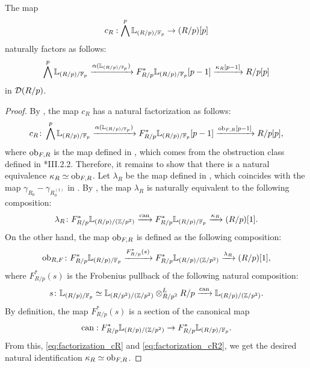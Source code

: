 \documentclass[11pt,a4paper]{amsart}
\begin{document}
\begin{proposition}\label{lemma2.8}
    The map 
    \[c_R:\bigwedge^p\mathbb{L}_{(R/p)/\mathbb{F}_p}\to (R/p)[p]\]
    naturally factors as follows:
    \[\bigwedge^p\mathbb{L}_{(R/p)/\mathbb{F}_p}\xrightarrow[]{\alpha(\mathbb{L}_{(R/p)/\mathbb{F}_p})}F^*_{R/p}\mathbb{L}_{(R/p)/\mathbb{F}_p}[p-1]\xrightarrow[]{\kappa_R[p-1]}R/p[p]\] in $\mathcal{D}(R/p)$. 
\end{proposition}
\begin{proof}
    By \cite[Theorem 7.1]{petrov2025Nondecomposability}, the map $c_R$ has a natural factorization as follows:
    \[c_R \colon \bigwedge^p\mathbb{L}_{(R/p)/\mathbb{F}_p}\xrightarrow[]{\alpha(\mathbb{L}_{(R/p)/\mathbb{F}_p})}F^*_{R/p}\mathbb{L}_{(R/p)/\mathbb{F}_p}[p-1]\xrightarrow[]{\operatorname{ob}_{F,R}[p-1]}R/p[p],\] where $\operatorname{ob}_{F,R}$ is the map defined in \cite[Convention 5.5 and Lemma 5.6]{petrov2025Nondecomposability}, which comes from the obstruction class defined in \cite{illusie1971Complexe}*{III.2.2}.
    Therefore, it remains to show that there is a natural equivalence \(\kappa_R\simeq \operatorname{ob}_{F,R}\).
    Let $\lambda_R$ be the map defined in \cite[Definition 5.2]{shimada2026Arithmetic}, which coincides with the map $\gamma_{R_0}-\gamma_{R_0^{(1)}}$ in \cite[Lemma 5.6]{petrov2025Nondecomposability}. By \cite[Theorem 5.3]{shimada2026Arithmetic}, the map $\lambda_R$ is naturally equivalent to the following composition:
    \begin{equation} \label{eq:factorization_cR}
        \lambda_R \colon F^*_{R/p}\mathbb{L}_{(R/p)/(\mathbb{Z}/p^2)}\xrightarrow[]{\operatorname{can}}F^*_{R/p}\mathbb{L}_{(R/p)/\mathbb{F}_p}\xrightarrow[]{\kappa_R}(R/p)[1].
    \end{equation}
    On the other hand, the map $\operatorname{ob}_{F,R}$ is defined as the following composition:
    \[\operatorname{ob}_{R, F} \colon F^*_{R/p}\mathbb{L}_{(R/p)/\mathbb{F}_p}\xrightarrow[]{F^*_{R/p}(s)}F^*_{R/p}\mathbb{L}_{(R/p)/(\mathbb{Z}/p^2)}\xrightarrow[]{\lambda_R}(R/p)[1],\] where $F^*_{R/p}(s)$ is the Frobenius pullback of the following natural composition:
    \begin{equation} \label{eq:factorization_cR2}
        s \colon \mathbb{L}_{(R/p)/\mathbb{F}_p}\simeq \mathbb{L}_{(R/p^2)/(\mathbb{Z}/p^2)}\otimes^L_{R/p^2}R/p\xrightarrow[]{\operatorname{can}}\mathbb{L}_{(R/p)/(\mathbb{Z}/p^2)}.
    \end{equation}
    By definition, the map $F^*_{R/p}(s)$ is a section of the canonical map\[\operatorname{can}:F^*_{R/p}\mathbb{L}_{(R/p)/(\mathbb{Z}/p^2)}\to F^*_{R/p}\mathbb{L}_{(R/p)/\mathbb{F}_p}.\] From this, \eqref{eq:factorization_cR} and \eqref{eq:factorization_cR2}, we get the desired natural identification \(\kappa_R\simeq \operatorname{ob}_{F,R}\).
\end{proof}
\end{document}
